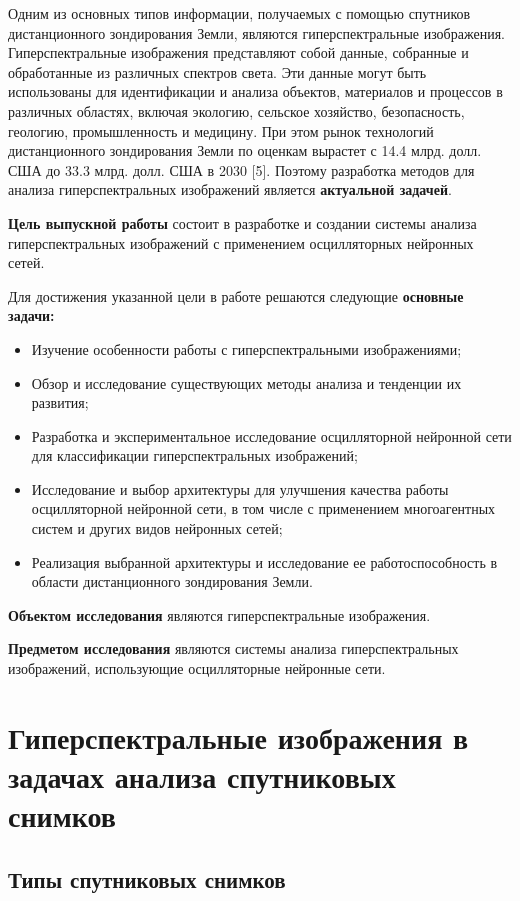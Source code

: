 \documentclass[14pt, russian]{scrartcl}
\begin{document}
Одним из основных типов информации, получаемых с помощью спутников дистанционного зондирования Земли,
являются гиперспектральные изображения. Гиперспектральные изображения представляют собой данные, собранные и обработанные
из различных спектров света. Эти данные могут быть использованы для идентификации и анализа объектов, материалов и процессов в различных
областях, включая экологию, сельское хозяйство, безопасность, геологию, промышленность и медицину.
При этом рынок технологий дистанционного зондирования Земли по оценкам вырастет с 14.4 млрд. долл. США до 33.3 млрд. долл. США в 2030 [5].
Поэтому разработка методов для анализа гиперспектральных изображений является \textbf{актуальной задачей}.

\textbf{Цель выпускной работы} состоит в разработке и создании системы анализа гиперспектральных изображений с применением осцилляторных нейронных сетей.

Для достижения указанной цели в работе решаются следующие \textbf{основные задачи:}

\begin{itemize}
    \item Изучение особенности работы с гиперспектральными изображениями;
    \item Обзор и исследование существующих методы анализа и тенденции их развития;
    \item Разработка и экспериментальное исследование осцилляторной нейронной сети для классификации гиперспектральных изображений;
    \item Исследование и выбор архитектуры для улучшения качества работы осцилляторной нейронной сети, в том числе с применением многоагентных систем и других видов нейронных сетей;
    \item Реализация выбранной архитектуры и исследование ее работоспособность в области дистанционного зондирования Земли.
\end{itemize}

\textbf{Объектом исследования} являются гиперспектральные изображения.

\textbf{Предметом исследования} являются системы анализа гиперспектральных изображений, использующие осцилляторные нейронные сети.

\section{Гиперспектральные изображения в задачах анализа спутниковых снимков}

\subsection{Типы спутниковых снимков}\label{sect:sat_im_types}
\end{document}
